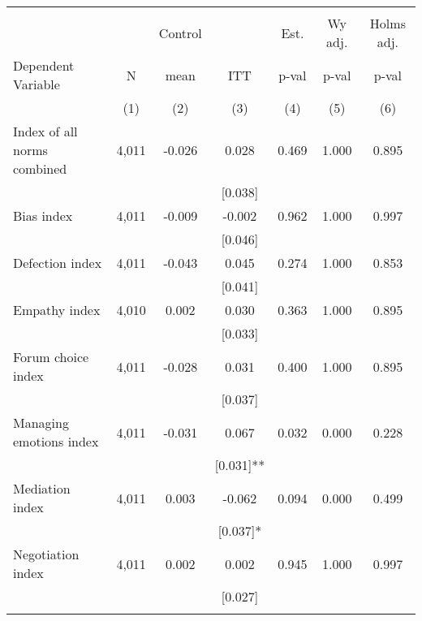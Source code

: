 \begin{tabular}{lcccccc}
\hline \noalign{\smallskip} &  &  &  &  &  & \\
 &  & Control &  & Est. & Wy adj. & Holms adj.\\
Dependent Variable & N & mean & ITT & p-val & p-val & p-val\\
 & (1) & (2) & (3) & (4) & (5) & (6)\\
\noalign{\smallskip}\hline \noalign{\smallskip}Index of all norms combined & 4,011 & -0.026 & 0.028 & 0.469 & 1.000 & 0.895\\
 &  &  & [0.038] &  &  & \\
\quad Bias index & 4,011 & -0.009 & -0.002 & 0.962 & 1.000 & 0.997\\
 &  &  & [0.046] &  &  & \\
\quad Defection index & 4,011 & -0.043 & 0.045 & 0.274 & 1.000 & 0.853\\
 &  &  & [0.041] &  &  & \\
\quad Empathy index & 4,010 & 0.002 & 0.030 & 0.363 & 1.000 & 0.895\\
 &  &  & [0.033] &  &  & \\
\quad Forum choice index & 4,011 & -0.028 & 0.031 & 0.400 & 1.000 & 0.895\\
 &  &  & [0.037] &  &  & \\
\quad Managing emotions index & 4,011 & -0.031 & 0.067 & 0.032 & 0.000 & 0.228\\
 &  &  & [0.031]** &  &  & \\
\quad Mediation index & 4,011 & 0.003 & -0.062 & 0.094 & 0.000 & 0.499\\
 &  &  & [0.037]* &  &  & \\
\quad Negotiation index & 4,011 & 0.002 & 0.002 & 0.945 & 1.000 & 0.997\\
 &  &  & [0.027] &  &  & \\
\noalign{\smallskip}\hline\end{tabular}
